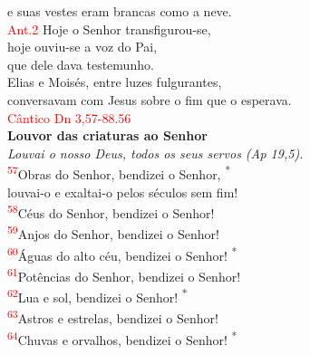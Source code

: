 \documentclass{book}
\begin{document}
\begin{center}
    e suas vestes eram brancas como a neve.
    \vspace{.2cm} \\
    \textcolor{red}{Ant.2} Hoje o Senhor transfigurou-se, \\
    hoje ouviu-se a voz do Pai, \\
    que dele dava testemunho. \\
    Elias e Moisés, entre luzes fulgurantes, \\
    conversavam com Jesus sobre o fim que o esperava.
    \vspace{.2cm} \\
    \textcolor{red}{Cântico Dn 3,57-88.56}
    \vspace{.2cm} \\
    \textbf{Louvor das criaturas ao Senhor} \\
    \textit{Louvai o nosso Deus, todos os seus servos (Ap 19,5).}
    \vspace{.2cm} \\
    \textsuperscript{\underline{\hspace{.06in}}\textcolor{red}{57}}Obras do Senhor, bendizei o Senhor, \textsuperscript{*} \\
    louvai-o e exaltai-o pelos séculos sem fim! \\
    \textsuperscript{\underline{\hspace{.06in}}\textcolor{red}{58}}Céus do Senhor, bendizei o Senhor! \\
    \textsuperscript{\textcolor{red}{59}}Anjos do Senhor, bendizei o Senhor!
    \vspace{.2cm} \\
    \textsuperscript{\underline{\hspace{.06in}}\textcolor{red}{60}}Águas do alto céu, bendizei o Senhor! \textsuperscript{*} \\
    \textsuperscript{\textcolor{red}{61}}Potências do Senhor, bendizei o Senhor! \\
    \textsuperscript{\underline{\hspace{.06in}}\textcolor{red}{62}}Lua e sol, bendizei o Senhor! \textsuperscript{*} \\
    \textsuperscript{\textcolor{red}{63}}Astros e estrelas, bendizei o Senhor!
    \vspace{.2cm} \\
    \textsuperscript{\underline{\hspace{.06in}}\textcolor{red}{64}}Chuvas e orvalhos, bendizei o Senhor! \textsuperscript{*} \\

\end{center}
\end{document}
